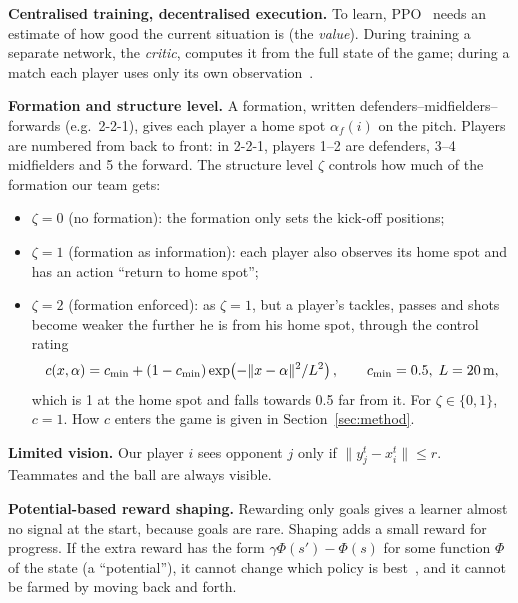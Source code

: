 \documentclass{article}
\begin{document}
\textbf{Centralised training, decentralised execution.} To learn, PPO~\cite{schulman2017ppo} needs an estimate of how good the current
situation is (the \emph{value}). During training a separate network, the \emph{critic}, computes it from the full state
of the game; during a match each player uses only its own observation~\cite{lowe2017maddpg}.

\textbf{Formation and structure level.} A formation, written defenders--midfielders--forwards (e.g.\ 2-2-1), gives each
player a home spot $\alpha_f(i)$ on the pitch. Players are numbered from back to front: in 2-2-1, players 1--2 are
defenders, 3--4 midfielders and 5 the forward. The structure level $\zeta$ controls how much of the formation our team
gets:
\begin{itemize}[leftmargin=1.5em]
\item $\zeta=0$ (no formation): the formation only sets the kick-off positions;
\item $\zeta=1$ (formation as information): each player also observes its home spot and has an action ``return to home
spot'';
\item $\zeta=2$ (formation enforced): as $\zeta=1$, but a player's tackles, passes and shots become weaker the further
he is from his home spot, through the control rating
\begin{equation}
c(x,\alpha)=c_{\min}+(1-c_{\min})\exp\!\left(-\|x-\alpha\|^2/L^2\right),\qquad c_{\min}=0.5,\;L=20\text{\,m},
\label{eq:control}
\end{equation}
which is 1 at the home spot and falls towards 0.5 far from it. For $\zeta\in\{0,1\}$, $c=1$. How $c$ enters the game is
given in Section~\ref{sec:method}.
\end{itemize}

\textbf{Limited vision.} Our player $i$ sees opponent $j$ only if $\|y_j^t-x_i^t\|\le r$. Teammates and the ball are
always visible.

\textbf{Potential-based reward shaping.} Rewarding only goals gives a learner almost no signal at the start, because
goals are rare. Shaping adds a small reward for progress. If the extra reward has the form $\gamma\Phi(s')-\Phi(s)$ for
some function $\Phi$ of the state (a ``potential''), it cannot change which policy is best~\cite{ng1999shaping}, and it
cannot be farmed by moving back and forth.
\end{document}
